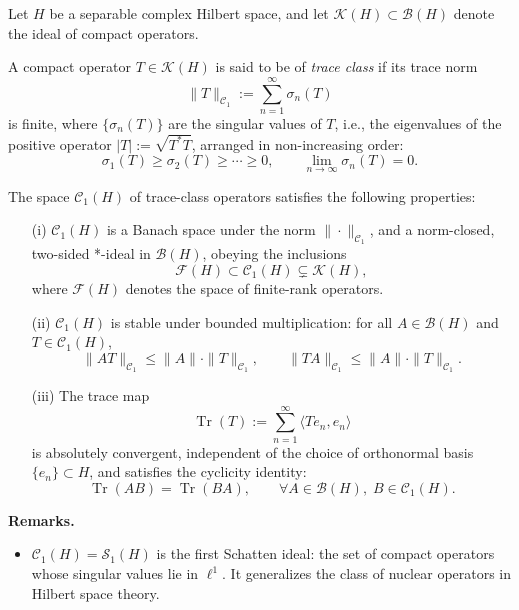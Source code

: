 \begin{definition}\label{def:trace_class_operator}
Let \( H \) be a separable complex Hilbert space, and let \( \mathcal{K}(H) \subset \mathcal{B}(H) \) denote the ideal of compact operators.

A compact operator \( T \in \mathcal{K}(H) \) is said to be of \emph{trace class} if its trace norm
\[
\| T \|_{\mathcal{C}_1} := \sum_{n=1}^\infty \sigma_n(T)
\]
is finite, where \( \{ \sigma_n(T) \} \) are the singular values of \( T \), i.e., the eigenvalues of the positive operator \( |T| := \sqrt{T^* T} \), arranged in non-increasing order:
\[
\sigma_1(T) \ge \sigma_2(T) \ge \cdots \ge 0, \qquad \lim_{n \to \infty} \sigma_n(T) = 0.
\]

The space \( \mathcal{C}_1(H) \) of trace-class operators satisfies the following properties:
\begin{enumerate}
    \item[\textup{(i)}] \( \mathcal{C}_1(H) \) is a Banach space under the norm \( \| \cdot \|_{\mathcal{C}_1} \), and a norm-closed, two-sided *-ideal in \( \mathcal{B}(H) \), obeying the inclusions
    \[
    \mathcal{F}(H) \subset \mathcal{C}_1(H) \subsetneq \mathcal{K}(H),
    \]
    where \( \mathcal{F}(H) \) denotes the space of finite-rank operators.

    \item[\textup{(ii)}] \( \mathcal{C}_1(H) \) is stable under bounded multiplication: for all \( A \in \mathcal{B}(H) \) and \( T \in \mathcal{C}_1(H) \),
    \[
    \| A T \|_{\mathcal{C}_1} \le \|A\| \cdot \|T\|_{\mathcal{C}_1}, \qquad
    \| T A \|_{\mathcal{C}_1} \le \|A\| \cdot \|T\|_{\mathcal{C}_1}.
    \]

    \item[\textup{(iii)}] The trace map
    \[
    \operatorname{Tr}(T) := \sum_{n=1}^\infty \langle T e_n, e_n \rangle
    \]
    is absolutely convergent, independent of the choice of orthonormal basis \( \{ e_n \} \subset H \), and satisfies the cyclicity identity:
    \[
    \operatorname{Tr}(AB) = \operatorname{Tr}(BA), \qquad \forall A \in \mathcal{B}(H),\; B \in \mathcal{C}_1(H).
    \]
\end{enumerate}

\medskip
\noindent\textbf{Remarks.}
\begin{itemize}
    \item \( \mathcal{C}_1(H) = \mathcal{S}_1(H) \) is the first Schatten ideal: the set of compact operators whose singular values lie in \( \ell^1 \). It generalizes the class of nuclear operators in Hilbert space theory.


\end{itemize}
\end{definition}
